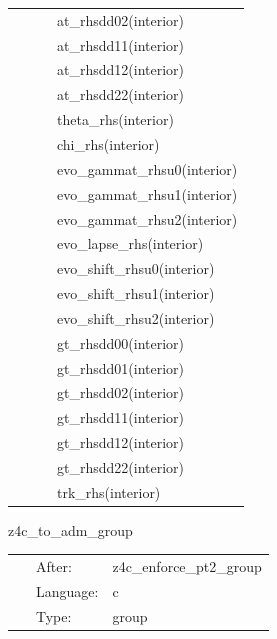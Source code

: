 \documentclass{article}
\begin{document}
\begin{tabular*}{160mm}{cll}
~& ~ &at\_rhsdd02(interior)\\ 
~& ~ &at\_rhsdd11(interior)\\ 
~& ~ &at\_rhsdd12(interior)\\ 
~& ~ &at\_rhsdd22(interior)\\ 
~& ~ &theta\_rhs(interior)\\ 
~& ~ &chi\_rhs(interior)\\ 
~& ~ &evo\_gammat\_rhsu0(interior)\\ 
~& ~ &evo\_gammat\_rhsu1(interior)\\ 
~& ~ &evo\_gammat\_rhsu2(interior)\\ 
~& ~ &evo\_lapse\_rhs(interior)\\ 
~& ~ &evo\_shift\_rhsu0(interior)\\ 
~& ~ &evo\_shift\_rhsu1(interior)\\ 
~& ~ &evo\_shift\_rhsu2(interior)\\ 
~& ~ &gt\_rhsdd00(interior)\\ 
~& ~ &gt\_rhsdd01(interior)\\ 
~& ~ &gt\_rhsdd02(interior)\\ 
~& ~ &gt\_rhsdd11(interior)\\ 
~& ~ &gt\_rhsdd12(interior)\\ 
~& ~ &gt\_rhsdd22(interior)\\ 
~& ~ &trk\_rhs(interior)\\ 
\end{tabular*} 


\vspace{5mm}


\hspace{5mm} z4c\_to\_adm\_group 

\hspace{5mm}{\it group for function `z4c\_to\_adm`. generated by einsteinengine. } 


\hspace{5mm}

 \begin{tabular*}{160mm}{cll} 
~ & After:  & z4c\_enforce\_pt2\_group \\ 
~ & Language:  & c \\ 
~ & Type:  & group \\ 
\end{tabular*} 


\vspace{5mm}

\end{document}
